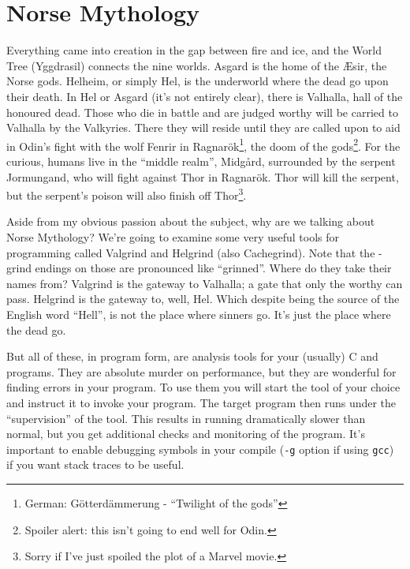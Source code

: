 




\section*{Norse Mythology}
Everything came into creation in the gap between fire and ice, and the World Tree (Yggdrasil) connects the nine worlds. Asgard is the home of the \AE sir, the Norse gods. Helheim, or simply Hel, is the underworld where the dead go upon their death. In Hel or Asgard (it's not entirely clear), there is Valhalla, hall of the honoured dead. Those who die in battle and are judged worthy will be carried to Valhalla by the Valkyries. There they will reside until they are called upon to aid in Odin's fight with the wolf Fenrir in Ragnar\"ok\footnote{German: G\"otterd\"ammerung - ``Twilight of the gods''}, the doom of the gods\footnote{Spoiler alert: this isn't going to end well for Odin.}. For the curious, humans live in the ``middle realm'', Midg\aa rd, surrounded by the serpent Jormungand, who will fight against Thor in  Ragnar\"ok. Thor will kill the serpent, but the serpent's poison will also finish off Thor\footnote{Sorry if I've just spoiled the plot of a Marvel movie.}.

Aside from my obvious passion about the subject, why are we talking about Norse Mythology? We're going to examine some very useful tools for programming called Valgrind and Helgrind (also Cachegrind). Note that the -grind endings on those are pronounced like ``grinned''. Where do they take their names from? Valgrind is the gateway to Valhalla; a gate that only the worthy can pass. Helgrind is the gateway to, well, Hel. Which despite being the source of the English word ``Hell'', is not the place where sinners go. It's just the place where the dead go.

But all of these, in program form, are analysis tools for your (usually) C and \Cpp programs. They are absolute murder on performance, but they are wonderful for finding errors in your program. To use them you will start the tool of your choice and instruct it to invoke your program. The target program then runs under the ``supervision'' of the tool. This results in running dramatically slower than normal, but you get additional checks and monitoring of the program. It's important to enable debugging symbols in your compile (\texttt{-g} option if using \texttt{gcc}) if you want stack traces to be useful.

